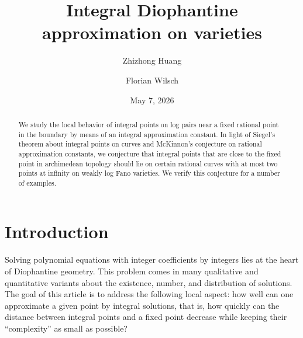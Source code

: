 \documentclass[a4paper, twoside, 11pt]{amsart}
\theoremstyle{definition}
\begin{document}
	\title{Integral Diophantine approximation on varieties}
	\author{Zhizhong Huang}
	\address{State Key Laboratory of Mathematical Sciences, Academy of Mathematics and Systems Science, Chinese Academy of Sciences, Beijing 100190, China}

	\author{Florian Wilsch}
	\address{Mathematisches Institut, Georg-August-Universität Göttingen, Bunsenstr.\ 3--5, 37073 Göttingen, Germany}

	\date{May 7, 2026}
	
	\begin{abstract}
	We study the local behavior of integral points on log pairs near a fixed rational point in the boundary by means of an integral approximation constant.
    In light of Siegel's theorem about integral points on curves and McKinnon's conjecture on rational approximation constants, we conjecture that integral points that are close to the fixed point in archimedean topology should lie on certain rational curves with at most two points at infinity on weakly log Fano varieties. We verify this conjecture for a number of examples.
	\end{abstract}
	
	\maketitle
	
	\tableofcontents
	
\section{Introduction}
Solving polynomial equations with integer coefficients by integers lies at the heart of Diophantine geometry. This problem comes in many qualitative and quantitative variants about the existence, number, and distribution of solutions. The goal of this article is to address the following local aspect: how well can one approximate a given point by integral solutions, that is, how quickly can the distance between integral points and a fixed point decrease while keeping their ``complexity'' as small as possible?
\end{document}
